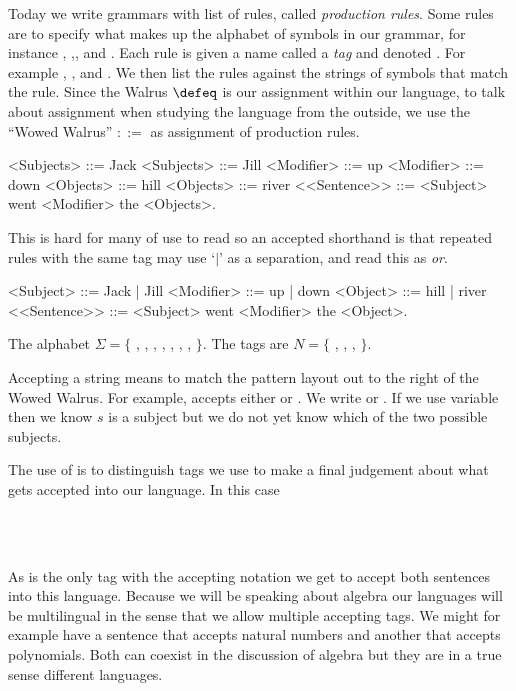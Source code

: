 \index{::=}
Today we write grammars with
list of rules, called \emph{production rules}.  Some rules are to specify what
makes up the alphabet of symbols in our grammar, for instance , 
,\code{+}, and .  Each rule is given a name called
a \emph{tag} and denoted . For example , 
, and .  We then list the rules against
the strings of symbols that match the rule.  Since the Walrus
$\defeq$ is our assignment within our language, to talk about assignment 
when studying the language from the outside, we use the
``Wowed Walrus'' $::=$ as assignment of production rules.   
\begin{center}
\begin{Gcode}[]
<Subjects> ::= Jack 
<Subjects> ::= Jill 
<Modifier> ::= up
<Modifier> ::= down
<Objects>  ::= hill
<Objects>  ::= river
<<Sentence>> ::= <Subject> went <Modifier> the <Objects>.
\end{Gcode}
\end{center}
This is hard for many of use to read so an accepted shorthand is that 
repeated rules with the same tag may use `$|$' as a separation, and 
read this as \emph{or}.
\begin{center}
\begin{Gcode}[]
<Subject> ::= Jack | Jill
<Modifier> ::= up | down 
<Object>  ::= hill | river
<<Sentence>> ::= <Subject> went <Modifier> the <Object>.
\end{Gcode}
\end{center}
The alphabet $\Sigma=\{$ , , 
, , , , , $\}$.
The tags are $N=\{$ , , , 
$\}$. 

Accepting a string means to match the pattern layout out to the right 
of the Wowed Walrus.  For example,  accepts either 
or .  We write  or .
If we use variable  then we know $s$ is a subject but 
we do not yet know which of the two possible subjects.  


The use of  is to distinguish tags we use to make a final 
judgement about what gets accepted into our language.  In this case 
\begin{center}
    \\
    \\
\end{center}
As  is the only tag with the accepting notation 
we get to accept both sentences into this language. 
Because we will be speaking about algebra our languages will be 
multilingual in the sense that we allow multiple accepting tags.
We might for example have a sentence that accepts natural numbers 
and another that accepts polynomials.  Both can coexist in the discussion 
of algebra but they are in a true sense different languages.


